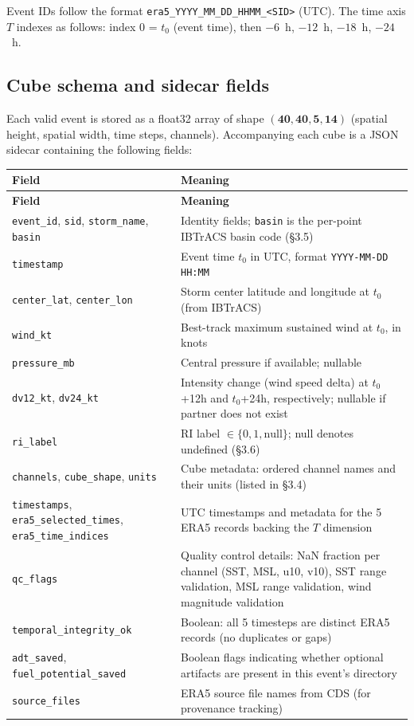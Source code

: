 \documentclass[11pt]{article}
\begin{document}
Event IDs follow the format \texttt{era5\_YYYY\_MM\_DD\_HHMM\_<SID>} (UTC).
The time axis $T$ indexes as follows: index 0 = $t_0$ (event time), then
$-6$~h, $-12$~h, $-18$~h, $-24$~h.

\subsection{Cube schema and sidecar fields}

Each valid event is stored as a float32 array of shape
$\mathbf{(40, 40, 5, 14)}$ (spatial height, spatial width, time steps,
channels). Accompanying each cube is a JSON sidecar containing the following
fields:

{\small
\begin{longtable}{L{5.0cm} L{10.0cm}}
\toprule
\textbf{Field} & \textbf{Meaning} \\
\midrule
\endfirsthead
\toprule
\textbf{Field} & \textbf{Meaning} \\
\midrule
\endhead
\texttt{event\_id}, \texttt{sid}, \texttt{storm\_name}, \texttt{basin} & Identity fields; \texttt{basin} is the per-point IBTrACS basin code (\S3.5) \\
\addlinespace
\texttt{timestamp} & Event time $t_0$ in UTC, format \texttt{YYYY-MM-DD HH:MM} \\
\addlinespace
\texttt{center\_lat}, \texttt{center\_lon} & Storm center latitude and longitude at $t_0$ (from IBTrACS) \\
\addlinespace
\texttt{wind\_kt} & Best-track maximum sustained wind at $t_0$, in knots \\
\addlinespace
\texttt{pressure\_mb} & Central pressure if available; nullable \\
\addlinespace
\texttt{dv12\_kt}, \texttt{dv24\_kt} & Intensity change (wind speed delta) at $t_0$+12h and $t_0$+24h, respectively; nullable if partner does not exist \\
\addlinespace
\texttt{ri\_label} & RI label $\in \{0, 1, \mathrm{null}\}$; null denotes undefined (\S3.6) \\
\addlinespace
\texttt{channels}, \texttt{cube\_shape}, \texttt{units} & Cube metadata: ordered channel names and their units (listed in \S3.4) \\
\addlinespace
\texttt{timestamps}, \texttt{era5\_selected\_times}, \texttt{era5\_time\_indices} & UTC timestamps and metadata for the 5 ERA5 records backing the $T$ dimension \\
\addlinespace
\texttt{qc\_flags} & Quality control details: NaN fraction per channel (SST, MSL, u10, v10), SST range validation, MSL range validation, wind magnitude validation \\
\addlinespace
\texttt{temporal\_integrity\_ok} & Boolean: all 5 timesteps are distinct ERA5 records (no duplicates or gaps) \\
\addlinespace
\texttt{adt\_saved}, \texttt{fuel\_potential\_saved} & Boolean flags indicating whether optional artifacts are present in this event's directory \\
\addlinespace
\texttt{source\_files} & ERA5 source file names from CDS (for provenance tracking) \\
\bottomrule
\end{longtable}
}
\end{document}
